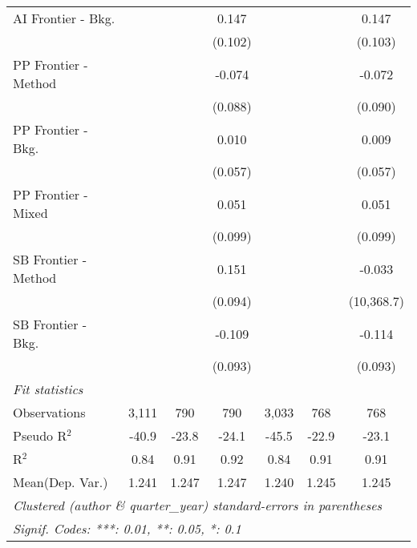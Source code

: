 \begin{tabular}{lcccccc}
   AI Frontier - Bkg.   &              &              & 0.147        &              &              & 0.147\\   
                        &              &              & (0.102)      &              &              & (0.103)\\   
   PP Frontier - Method &              &              & -0.074       &              &              & -0.072\\   
                        &              &              & (0.088)      &              &              & (0.090)\\   
   PP Frontier - Bkg.   &              &              & 0.010        &              &              & 0.009\\   
                        &              &              & (0.057)      &              &              & (0.057)\\   
   PP Frontier - Mixed  &              &              & 0.051        &              &              & 0.051\\   
                        &              &              & (0.099)      &              &              & (0.099)\\   
   SB Frontier - Method &              &              & 0.151        &              &              & -0.033\\   
                        &              &              & (0.094)      &              &              & (10,368.7)\\   
   SB Frontier - Bkg.   &              &              & -0.109       &              &              & -0.114\\   
                        &              &              & (0.093)      &              &              & (0.093)\\   
   \midrule
   \emph{Fit statistics}\\
   Observations         & 3,111        & 790          & 790          & 3,033        & 768          & 768\\  
   Pseudo R$^2$         & -40.9        & -23.8        & -24.1        & -45.5        & -22.9        & -23.1\\  
   R$^2$                & 0.84         & 0.91         & 0.92         & 0.84         & 0.91         & 0.91\\  
Mean(Dep. Var.) & 1.241 & 1.247 & 1.247 & 1.240 & 1.245 & 1.245 \\
   \midrule \midrule
   \multicolumn{7}{l}{\emph{Clustered (author \& quarter\_year) standard-errors in parentheses}}\\
   \multicolumn{7}{l}{\emph{Signif. Codes: ***: 0.01, **: 0.05, *: 0.1}}\\
\end{tabular}
\par\endgroup
